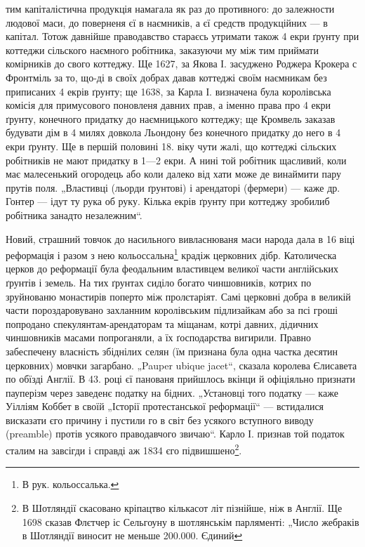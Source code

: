 \parcont{}
тим капіталістична продукція намагала як раз до противного: до залежности людової маси, до поверненя
єї в наємників, а єї средств продукційних — в капітал. Тотож давнійше праводавство стараєсь утримати
також 4 екри ґрунту при коттеджи сільского наємного робітника, заказуючи му між тим приймати
комірників до свого коттеджу. Ще 1627, за Якова І. засуджено Роджера Крокера с Фронтміль за то,
що-ді в своїх добрах давав коттеджі своїм наємникам без приписаних 4 екрів ґрунту; ще 1638, за Карла
І. визначена була королівська комісія для примусового поновленя давних прав, а іменно права про 4
екри ґрунту, конечного придатку до наємницького коттеджу; ще Кромвель заказав будувати дім в 4 милях
довкола Льондону без конечного придатку до него в 4 екри ґрунту. Ще в першій половині 18. віку чути
жалі, що коттеджі сільских робітників не мают придатку в 1—2 екри. А нині той робітник щасливий,
коли має малесенький огородець або коли далеко від хати може де винаймити пару прутів поля.
„Властивці (льорди ґрунтові) і арендаторі (фермери) — каже др. Гонтер — ідут ту рука об руку. Кілька
екрів ґрунту при коттеджу зробилиб робітника занадто незалежним“.

Новий, страшний товчок до насильного вивласнюваня маси народа дала в 16 віці реформація і разом з
нею кольоссальна\footnote*{
В рук. кольоссалька.
} крадіж церковних дібр. Католическа церков до реформації була феодальним
властивцем великої части англійських ґрунтів і земель. На тих ґрунтах сиділо богато чиншовників,
котрих по зруйнованю монастирів поперто між пролєтаріят. Самі церковні добра в великій части
пороздаровувано захланним королівським підлизайкам або за псі гроші попродано
спекулянтам-арендаторам та міщанам, котрі давних, дідичних чиншовників масами попроганяли, а їх
ґосподарства вигирили. Правно забеспечену власність збіднілих селян (їм признана була одна частка
десятин церковних) мовчки загарбано. „Pauper ubique jacet“, сказала королева Єлисавета по обїзді
Англії. В 43. році єї панованя прийшлось вкінци й офіціяльно признати пауперізм через заведенє
податку на бідних. „Установці того податку
— каже Уілліям Коббет в своїй „Історії протестанської реформації“ — встидалися висказати єго причину
і пустили го в світ без усякого вступного виводу (preamble) протів усякого праводавчого звичаю“.
Карло І. признав той податок сталим на завсігди і справді аж 1834 єго підвишшено\footnote{
В Шотляндії скасовано кріпацтво кількасот літ пізнійше, ніж в Англії. Ще 1698 сказав Флєтчер іс
Сельгоуну в шотлянськім парляменті: „Число жебраків в Шотляндії виносит не меньше 200.000. Єдиний
}.
